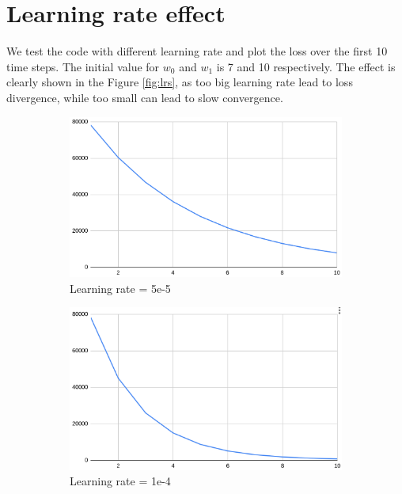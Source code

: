 \documentclass{article}
\begin{document}
\section{Learning rate effect}
We test the code with different learning rate and plot the loss over the first 10 time steps.
The initial value for $w_0$ and $w_1$ is 7 and 10 respectively.
The effect is clearly shown in the Figure \ref{fig:lrs}, as too big learning rate lead to loss divergence, while too small can lead to slow convergence.
\begin{figure}[H]
\centering
\begin{subfigure}{0.4\textwidth}
    \includegraphics[width=\linewidth]{lr5e5.png}
    \caption{Learning rate = 5e-5}
\end{subfigure}
\begin{subfigure}{0.4\textwidth}
    \includegraphics[width=\linewidth]{lr1e4.png}
    \caption{Learning rate = 1e-4}
\end{subfigure}
\begin{subfigure}{0.4\textwidth}

\end{subfigure}
\end{figure}
\end{document}

